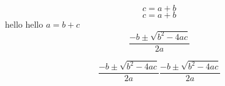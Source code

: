 \documentclass{book} %
\begin{document}
\[c=a+b\]
$$c=a+b$$
hello hello $a=b+c$
\begin{equation}
\frac{{ - b \pm \sqrt {{b^2} - 4ac} }}{{2a}}
\end{equation}

\begin{subequations}
	\begin{equation}
	\frac{{ - b \pm \sqrt {{b^2} - 4ac} }}{{2a}}
	\end{equation}
	\begin{equation}
	\frac{{ - b \pm \sqrt {{b^2} - 4ac} }}{{2a}}
	\end{equation}
\end{subequations}
\end{document}
